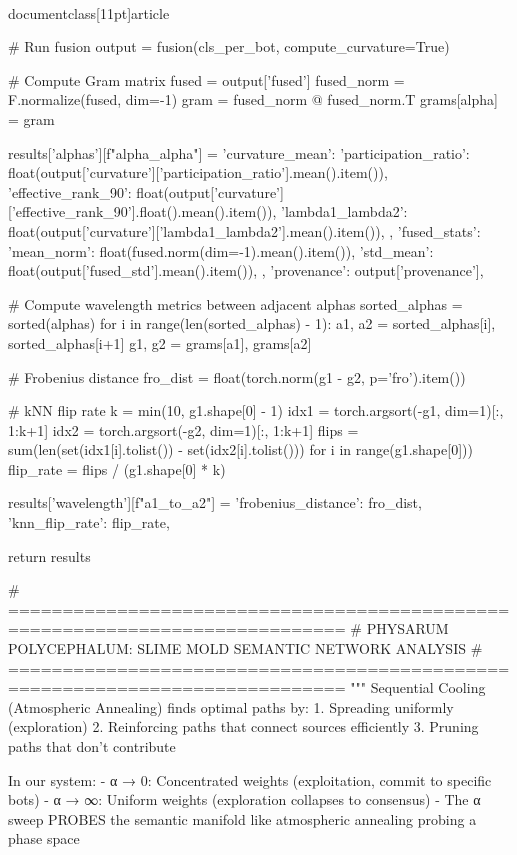 \\documentclass[11pt]{article}
\begin{document}
\begin{CodeBlock}
{{{{{{{{        # Run fusion
        output = fusion(cls_per_bot, compute_curvature=True)
        
        # Compute Gram matrix
        fused = output['fused']
        fused_norm = F.normalize(fused, dim=-1)
        gram = fused_norm @ fused_norm.T
        grams[alpha] = gram
        
        results['alphas'][f"alpha_{alpha}"] = {
            'curvature_mean': {
                'participation_ratio': float(output['curvature']['participation_ratio'].mean().item()),
                'effective_rank_90': float(output['curvature']['effective_rank_90'].float().mean().item()),
                'lambda1_lambda2': float(output['curvature']['lambda1_lambda2'].mean().item()),
            },
            'fused_stats': {
                'mean_norm': float(fused.norm(dim=-1).mean().item()),
                'std_mean': float(output['fused_std'].mean().item()),
            },
            'provenance': output['provenance'],
        }
    
    # Compute wavelength metrics between adjacent alphas
    sorted_alphas = sorted(alphas)
    for i in range(len(sorted_alphas) - 1):
        a1, a2 = sorted_alphas[i], sorted_alphas[i+1]
        g1, g2 = grams[a1], grams[a2]
        
        # Frobenius distance
        fro_dist = float(torch.norm(g1 - g2, p='fro').item())
        
        # kNN flip rate
        k = min(10, g1.shape[0] - 1)
        idx1 = torch.argsort(-g1, dim=1)[:, 1:k+1]
        idx2 = torch.argsort(-g2, dim=1)[:, 1:k+1]
        flips = sum(len(set(idx1[i].tolist()) - set(idx2[i].tolist())) for i in range(g1.shape[0]))
        flip_rate = flips / (g1.shape[0] * k)
        
        results['wavelength'][f"{a1}_to_{a2}"] = {
            'frobenius_distance': fro_dist,
            'knn_flip_rate': flip_rate,
        }
    
    return results


# =============================================================================
# PHYSARUM POLYCEPHALUM: SLIME MOLD SEMANTIC NETWORK ANALYSIS
# =============================================================================
"""
Sequential Cooling (Atmospheric Annealing) finds optimal paths by:
1. Spreading uniformly (exploration)
2. Reinforcing paths that connect sources efficiently
3. Pruning paths that don't contribute

In our system:
- α → 0: Concentrated weights (exploitation, commit to specific bots)
- α → ∞: Uniform weights (exploration collapses to consensus)
- The α sweep PROBES the semantic manifold like atmospheric annealing probing a phase space

}}}}}}}}
\end{CodeBlock}
\end{document}
